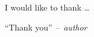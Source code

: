 \begin{acknowledgement}

I would like to thank \ldots

\vspace{2.5mm}

``Thank you'' \emph{--~author}

\end{acknowledgement}
